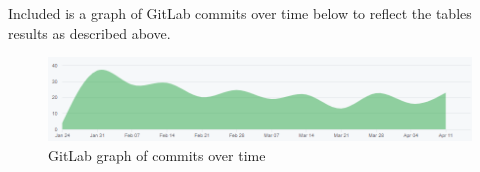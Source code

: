 Included is a graph of GitLab commits over time below to reflect the tables results as described above. 

\begin{figure}[H]
	\centering
	\includegraphics[width=1\linewidth]{Figures/gitlab-commit-graph.png}
	\caption{GitLab graph of commits over time}
	\label{fig:gitlab-graph}
\end{figure}
